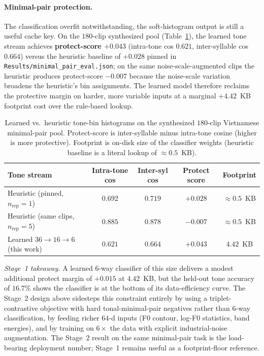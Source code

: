 \documentclass[a4paper,fleqn]{cas-dc}
\begin{document}
\paragraph{Minimal-pair protection.} The classification overfit notwithstanding, the soft-histogram output is still a useful cache key. On the $180$-clip synthesized pool (Table~\ref{tab:learned_tone}), the learned tone stream achieves \textbf{protect-score $+0.043$} (intra-tone cos $0.621$, inter-syllable cos $0.664$) versus the heuristic baseline of $+0.028$ pinned in \texttt{Results/minimal\_pair\_eval.json}; on the same noise-scale-augmented clips the heuristic produces protect-score $-0.007$ because the noise-scale variation broadens the heuristic's bin assignments. The learned model therefore reclaims the protective margin on harder, more variable inputs at a marginal $+4.42$~KB footprint cost over the rule-based lookup.

\begin{table}[h]
\caption{Learned vs.\ heuristic tone-bin histograms on the synthesized $180$-clip Vietnamese minimal-pair pool. Protect-score is inter-syllable minus intra-tone cosine (higher is more protective). Footprint is on-disk size of the classifier weights (heuristic baseline is a literal lookup of $\approx 0.5$~KB).}\label{tab:learned_tone}
\centering\footnotesize
\begin{tabular}{lcccc}
\toprule
Tone stream & Intra-tone cos & Inter-syl cos & Protect score & Footprint \\
\midrule
Heuristic (pinned, $n_\text{rep}=1$)        & $0.692$ & $0.719$ & $\mathbf{+0.028}$ & $\approx 0.5$~KB \\
Heuristic (same clips, $n_\text{rep}=5$)    & $0.885$ & $0.878$ & $-0.007$          & $\approx 0.5$~KB \\
Learned $36 \to 16 \to 6$ (this work)       & $0.621$ & $0.664$ & $\mathbf{+0.043}$ & $\mathbf{4.42}$~KB \\
\bottomrule
\end{tabular}
\end{table}

\noindent\textit{Stage~1 takeaway.} A learned 6-way classifier of this size delivers a modest additional protect margin of $+0.015$ at $4.42$~KB, but the held-out tone accuracy of $16.7\%$ shows the classifier is at the bottom of its data-efficiency curve. The Stage~2 design above sidesteps this constraint entirely by using a triplet-contrastive objective with hard tonal-minimal-pair negatives rather than 6-way classification, by feeding richer $64$-d inputs (F0 contour, log-F0 statistics, band energies), and by training on $6\times$ the data with explicit industrial-noise augmentation. The Stage~2 result on the same minimal-pair task is the load-bearing deployment number; Stage~1 remains useful as a footprint-floor reference.
\end{document}

